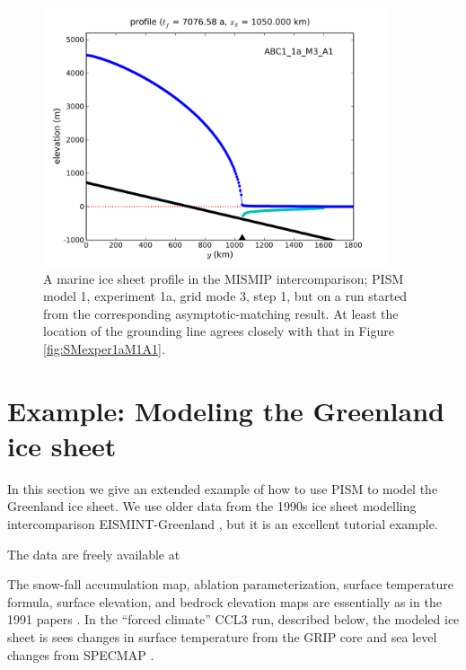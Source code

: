 \documentclass[11pt,final]{amsart}
\begin{document}
\begin{figure}[ht]
\includegraphics[width=4.0in,keepaspectratio=true]{profile_EBU1_1a_M3_A1}
\caption{A marine ice sheet profile in the MISMIP intercomparison; PISM model 1, experiment 1a, grid mode 3, step 1, but on a run started from the corresponding asymptotic-matching result.  At least the location of the grounding line agrees closely with that in Figure \ref{fig:SMexper1aM1A1}.}
\label{fig:MISMIPmodel1exper1aM3A1FROMSM}
\end{figure}


\clearpage\newpage

\section{Example: Modeling the Greenland ice sheet}\label{sec:eismint-greenland}  

In this section we give an extended example of how to use PISM to model the Greenland ice sheet.  We use older data from the 1990s ice sheet modelling intercomparison EISMINT-Greenland \cite{HuybrechtsEISMINT,RitzEISMINT}, but it is an excellent tutorial example.

The data are freely available at
\medskip

\centerline{}
\medskip

\noindent The snow-fall accumulation map, ablation parameterization, surface temperature formula, surface elevation, and bedrock elevation maps are essentially as in the 1991 papers \cite{Letreguillyetal1991,OhmuraReeh}.  In the ``forced climate'' CCL3 run, described below, the modeled ice sheet is sees changes in surface temperature from the GRIP core \cite{Dansgaardetal1993} and sea level changes from SPECMAP \cite{Imbrieetal1984}.
\end{document}

